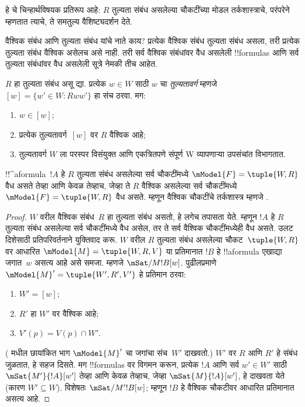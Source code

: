 \documentclass[../../../include/open-logic-section]{subfiles}
\begin{document}
 हे 
चे चिन्हार्थविषयक प्रतिरूप आहे: $R$ तुल्यता संबंध
असलेल्या चौकटींच्या मोडल तर्कशास्त्राचे, परंपरेने
 म्हणतात त्याचे, ते समतुल्य वैशिष्ट्यदर्शन देते.

वैश्विक संबंध आणि तुल्यता संबंध यांचे नाते काय?
प्रत्येक वैश्विक संबंध तुल्यता संबंध असला, तरी
प्रत्येक तुल्यता संबंध वैश्विक असेलच असे नाही.
तरी सर्व वैश्विक संबंधांवर वैध असलेली !!{formula}s
आणि सर्व तुल्यता संबंधांवर वैध असलेली सूत्रे
नेमकी तीच आहेत.

\begin{prop}
  $R$ हा तुल्यता संबंध असू द्या. प्रत्येक $w \in W$
  साठी $w$ चा \emph{तुल्यतावर्ग} म्हणजे
  $[w] = \{w'\in W :
  Rww'\}$ हा संच ठरवा. मग:
  \begin{enumerate}
  \item $w \in [w]$;
  \item प्रत्येक तुल्यतावर्ग~$[w]$ वर $R$ वैश्विक आहे;
  \item तुल्यतावर्ग $W$ ला परस्पर विसंयुक्त आणि
    एकत्रितपणे संपूर्ण W व्यापणाऱ्या उपसंचांत विभागतात.
  \end{enumerate}
\end{prop}

\begin{prop}
  !!^a{formula}~$!A$ हे $R$ तुल्यता संबंध असलेल्या
  सर्व चौकटींमध्ये $\mModel{F} =\tuple{W,R}$ वैध
  असते तेव्हा आणि केवळ तेव्हाच, जेव्हा ते $R$
  वैश्विक असलेल्या सर्व चौकटींमध्ये
  $\mModel{F} =\tuple{W,R}$ वैध असते. म्हणून
  वैश्विक चौकटींचे तर्कशास्त्र म्हणजे .
\end{prop}

\begin{proof}
  $W$ वरील वैश्विक संबंध~$R$ हा तुल्यता संबंध असतो,
  हे लगेच तपासता येते. म्हणून $!A$ हे $R$ तुल्यता
  संबंध असलेल्या सर्व चौकटींमध्ये वैध असेल, तर ते
  सर्व वैश्विक चौकटींमध्येही वैध असते. उलट दिशेसाठी
  प्रतिपरिवर्तनाने युक्तिवाद करू. $W$ वरील $R$
  तुल्यता संबंध असलेल्या चौकट~$\tuple{W,R}$ वर
  आधारित $\mModel{M} = \tuple{W, R, V}$ या
  प्रतिमानात $!B$ हे !!a{formula} एखाद्या जगात~$w$
  असत्य आहे असे समजा. म्हणजे $\mSat/{M}{!B}[w]$.
  पुढीलप्रमाणे $\mModel{M}' = \tuple{W',
    R', V'}$ हे प्रतिमान ठरवा:
  \begin{enumerate}
  \item $W' = [w]$;
  \item $R'$ हा $W'$ वर वैश्विक आहे;
  \item $V'(p) = V(p) \cap W'$.
  \end{enumerate}
  ( मधील छायांकित भाग
  $\mModel{M}'$ चा जगांचा संच~$W'$ दाखवतो.)
  $W'$ वर $R$ आणि $R'$ हे संबंध जुळतात, हे सहज
  दिसते. मग !!{formula}s वर विगमन करून, प्रत्येक
  $!A$ आणि सर्व $w' \in W'$ साठी
  $\mSat{M'}{!A}[w']$ तेव्हा आणि केवळ तेव्हाच,
  जेव्हा $\mSat{M}{!A}[w']$, हे दाखवता येते
  (कारण $W'
  \subseteq W$). विशेषतः $\mSat/{M'}{!B}[w]$;
  म्हणून $!B$ हे वैश्विक चौकटीवर आधारित
  प्रतिमानात असत्य आहे.
\end{proof}
\end{document}
